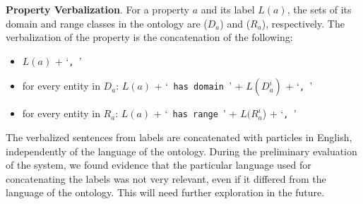 \documentclass[
]{ceurart}
\begin{document}
\textbf{Property Verbalization}. For a property $a$ and its label $L(a)$, the sets of its domain and range classes in the ontology are ($D_a$) and ($R_a$), respectively. The verbalization of the property is the concatenation of the following:

\begin{itemize}
    \item $L(a)$ + `\verb|, |' 
    \item for every entity in $D_a$: $L(a)$ + `\verb| has domain |' + $L(D_a^i)$ + `\verb|, |' 
    \item for every entity in $R_a$: $L(a)$ + `\verb| has range |' + $L(R_a^i$) + `\verb|, |' 
\end{itemize}

The verbalized sentences from labels are concatenated with particles in English, independently of the language of the ontology. During the preliminary evaluation of the system, we found evidence that the particular language used for concatenating the labels was not very relevant, even if it differed from the language of the ontology. This will need further exploration in the future. %



\end{document}
